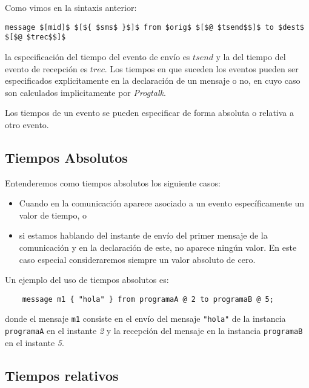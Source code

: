 Como vimos en la sintaxis anterior:
\begin{center}
  \begin{minipage}{0.75\linewidth}
\begin{lstlisting}[mathescape]
message $[mid]$ $[${ $sms$ }$]$ from $orig$ $[$@ $tsend$$]$ to $dest$ $[$@ $trec$$]$
\end{lstlisting}
  \end{minipage}
\end{center}
la especificación del tiempo del evento de envío es $tsend$ y la del tiempo del evento de recepción es $trec$.
 Los tiempos en que suceden los eventos pueden ser
especificados explicitamente en la declaración de un mensaje o no, en
cuyo caso son calculados implicitamente por \textit{Progtalk}.

Los tiempos de un evento se pueden especificar de forma absoluta o relativa a otro evento.

\subsection{Tiempos Absolutos}

Entenderemos como tiempos absolutos los siguiente casos:

\begin{itemize}
\item Cuando en la comunicación aparece asociado a un evento
  específicamente un valor de tiempo, o
\item si estamos hablando del instante de envío del primer mensaje de
  la comunicación y en la declaración de este, no aparece ningún valor. En
  este caso especial consideraremos siempre un valor absoluto de cero.
\end{itemize}

Un ejemplo del uso de tiempos absolutos es:

\begin{lstlisting}
    message m1 { "hola" } from programaA @ 2 to programaB @ 5;
\end{lstlisting}

\noindent donde el mensaje \lstinline{m1} consiste en el envío del mensaje
\lstinline{"hola"} de la instancia \lstinline{programaA} en el
instante \textit{2} y la recepción del mensaje en la instancia
\lstinline{programaB} en el instante \textit{5}.

\subsection{Tiempos relativos}

